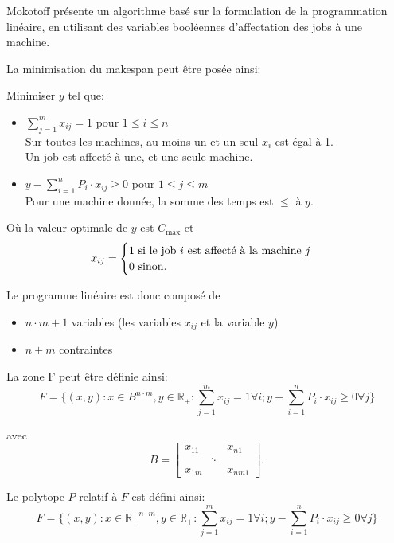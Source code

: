 \documentclass[a4paper,12pt]{report}
\theoremstyle{plain}				%
\theoremstyle{definition}				%
\newcommand{\lp}[1]{\todo[author=LP,color=yellow,inline]{#1}}
\begin{document}
Mokotoff \cite{mokoto1999scheduling} présente un algorithme basé sur
la formulation de la programmation linéaire, en utilisant des
variables booléennes d'affectation des jobs à une machine.

\lp{définir $x_{ij}$}
\bigskip
La minimisation du makespan peut être posée ainsi:

Minimiser $y$ tel que:

\begin{itemize}
\item $\sum_{j=1}^{m}x_{ij}=1$ \quad pour $1 \leq i \leq n$ 		\\
Sur toutes les machines, au moins un et un seul $x_i$ est égal à 1.	\\
Un job est affecté à une, et une seule machine.

\item $y-\sum_{i=1}^{n}P_i \cdot x_{ij} \geq 0$ \quad pour $1 \leq j \leq m$ \\
Pour une machine donnée, la somme des temps est $\leq$ à $y$.
\end{itemize}

\bigskip
Où la valeur optimale de $y$ est $C_{\max}$
et
\[
  x_{ij} =
  \begin{cases}
    1 \textnormal{ si le job $i$ est affecté à la machine $j$}\\
    0 \textnormal{ sinon.}\\
  \end{cases}
\]

Le programme linéaire est donc composé de
\begin{itemize}
\item $n \cdot m + 1$ variables (les variables $x_{ij}$ et la variable $y$)
\item $n+m$ contraintes
\end{itemize}

La zone F peut être définie ainsi:
\[
  F=\{ (x,y) : x \in B^{n \cdot m}, y \in \mathbb{R_+} : \sum_{j=1}^{m} x_{ij}=1 \forall i;
y-\sum_{i=1}^{n} P_i \cdot x_{ij} \geq 0 \forall j \}
\]

avec
\[
B=\begin{bmatrix}
x_{11}& &x_{n1}\\
& \ddots & \\
x_{1m}& &x_{nm1}
\end{bmatrix}.
\]

Le polytope $P$ relatif à $F$ est défini ainsi:
\[
  F=\{ (x,y) : x \in \mathbb{R_+}^{n \cdot m}, y \in \mathbb{R_+} : \sum_{j=1}^{m} x_{ij}=1 \forall i;
  y-\sum_{i=1}^{n} P_i \cdot x_{ij} \geq 0 \forall j	\}
\]
\end{document}

